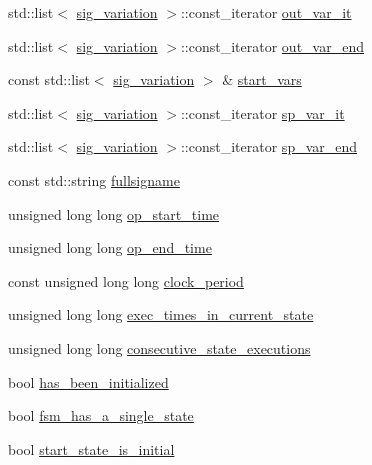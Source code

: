 \begin{DoxyCompactItemize}
\item 
std\+::list$<$ \hyperlink{structsig__variation}{sig\+\_\+variation} $>$\+::const\+\_\+iterator \hyperlink{structvcd__trace__head_a8d81fbe60f9ec091baeeb08d810556a8}{out\+\_\+var\+\_\+it}
\item 
std\+::list$<$ \hyperlink{structsig__variation}{sig\+\_\+variation} $>$\+::const\+\_\+iterator \hyperlink{structvcd__trace__head_a9f295da972306c34afa09c14338cab9b}{out\+\_\+var\+\_\+end}
\item 
const std\+::list$<$ \hyperlink{structsig__variation}{sig\+\_\+variation} $>$ \& \hyperlink{structvcd__trace__head_a500dbaecd7bec2e4601e2d878d075ae5}{start\+\_\+vars}
\item 
std\+::list$<$ \hyperlink{structsig__variation}{sig\+\_\+variation} $>$\+::const\+\_\+iterator \hyperlink{structvcd__trace__head_ac4fbf68c61ede724a8b3bf1e31d4b476}{sp\+\_\+var\+\_\+it}
\item 
std\+::list$<$ \hyperlink{structsig__variation}{sig\+\_\+variation} $>$\+::const\+\_\+iterator \hyperlink{structvcd__trace__head_a243e3e9502ce1ae7139cdbff5a827062}{sp\+\_\+var\+\_\+end}
\item 
const std\+::string \hyperlink{structvcd__trace__head_a8f424c51043c8252abcf4ff39c77c04e}{fullsigname}
\item 
unsigned long long \hyperlink{structvcd__trace__head_af546fb3d7dd888de25ba81ac51eeef48}{op\+\_\+start\+\_\+time}
\item 
unsigned long long \hyperlink{structvcd__trace__head_a3e830d6baf387e53ab806f01b62ad287}{op\+\_\+end\+\_\+time}
\item 
const unsigned long long \hyperlink{structvcd__trace__head_aa2628fa99bf78726ad2bc68d2e26b8cc}{clock\+\_\+period}
\item 
unsigned long long \hyperlink{structvcd__trace__head_a664e943fb2c8b9d90d301d5bd429d96b}{exec\+\_\+times\+\_\+in\+\_\+current\+\_\+state}
\item 
unsigned long long \hyperlink{structvcd__trace__head_aaf2ebcdc364e155ea3fc576fde1239a4}{consecutive\+\_\+state\+\_\+executions}
\item 
bool \hyperlink{structvcd__trace__head_adb1635d0b8337b81a4a47f14eda31ab3}{has\+\_\+been\+\_\+initialized}
\item 
bool \hyperlink{structvcd__trace__head_acc03a8b5a503e805abc218101be1a320}{fsm\+\_\+has\+\_\+a\+\_\+single\+\_\+state}
\item 
bool \hyperlink{structvcd__trace__head_a3e61d1aa9602b8820de30b1f1da92298}{start\+\_\+state\+\_\+is\+\_\+initial}
\end{DoxyCompactItemize}
